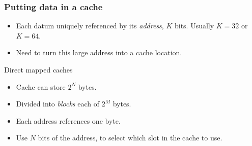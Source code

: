 \documentclass[presentation,aspectratio=43,10pt]{beamer}
\begin{document}
\begin{frame}[fragile]
  \frametitle{Putting data in a cache}
  \begin{itemize}
  \item Each datum uniquely referenced by its \emph{address}, $K$
    bits.  Usually $K = 32$ or $K = 64$.
  \item Need to turn this large address into a cache location.
  \end{itemize}

  \begin{block}{Direct mapped caches}
    \begin{itemize}
    \item Cache can store $2^N$ bytes.
    \item Divided into \emph{blocks} each of $2^M$ bytes.
    \item Each address references one byte.
    \item Use $N$ bits of the address, to select which slot
      in the cache to use.
    \end{itemize}
  \end{block}
\end{frame}
\end{document}
